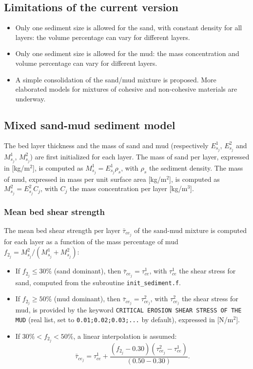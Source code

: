 \subsection{Limitations of the current version} 
\begin{itemize}
\item Only one sediment size is allowed for the sand, with constant density for all layers: the volume percentage can vary for different layers.
\item Only one sediment size is allowed for the mud: the mass concentration and volume percentage can vary for different layers.
\item A simple consolidation of the sand/mud mixture is proposed. More elaborated models for mixtures of cohesive and non-cohesive materials are underway.
\end{itemize}

\subsection{Mixed sand-mud sediment model} 

The bed layer thickness and the mass of sand and mud (respectively $E_{s_j}^1$, $E_{s_j}^2$ and $M_{s_j}^1$, $M_{s_j}^2$) are first initialized for each layer. The mass of sand per layer, expressed in [kg/m$^2$], is computed as $M_{s_j}^1=E_{s_j}^1\rho_s$, with $\rho_s$ the sediment density. The mass of mud, expressed in mass per unit surface area [kg/m$^2$], is computed as $M_{s_j}^2=E_{s_j}^2 C_j$, with $C_j$ the mass concentration per layer [kg/m$^3$]. 

\subsubsection{Mean bed shear strength}
The mean bed shear strength per layer $\bar \tau_{ce_j}$ of the sand-mud mixture is computed for each layer as a function of the mass percentage of mud $f_{2_j}=M_{s_j}^2/(M_{s_j}^1+M_{s_j}^2)$:
\begin{itemize}
\item If $f_{2_j} \leq 30\%$ (sand dominant), then $\bar \tau_{ce_j} = \tau_{ce}^1$, with $\tau_{ce}^1$ the shear stress for sand, computed from the subroutine \texttt{init\_sediment.f}.
\item If $f_{2_j} \geq 50\%$ (mud dominant), then $\bar \tau_{ce_j} = \tau_{ce_j}^2$, with $\tau_{ce_j}^2$ the shear stress for mud, is provided by the keyword \texttt{CRITICAL EROSION SHEAR STRESS OF THE MUD} (real list, set to \texttt{0.01;0.02;0.03;...} by default), expressed in [N/m$^2$].
\item If $30\% < f_{2_j} < 50\%$, a linear interpolation is assumed:
\begin{equation}
\bar \tau_{ce_j} = \tau_{ce}^1 + \frac{(f_{2_j}-0.30)(\tau_{ce_j}^2-\tau_{ce}^1)}{(0.50-0.30)}.
\end{equation}
\end{itemize}

